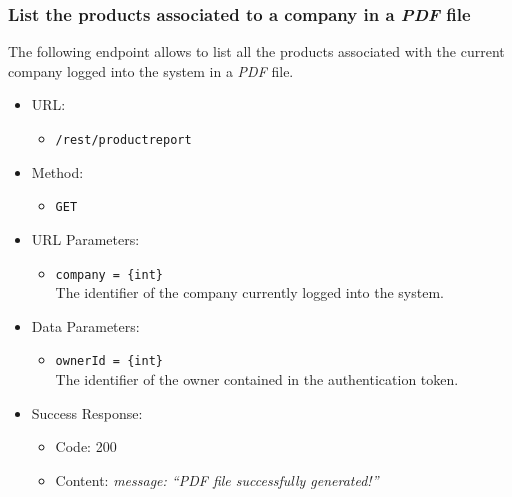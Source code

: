 \newpage
\subsubsection*{List the products associated to a company in a \textit{PDF} file}

The following endpoint allows to list all the products associated with the current company logged into the system in a \textit{PDF} file.

\begin{itemize}
    
    \item URL: 
    \begin{itemize}
        \item \texttt{/rest/productreport}
    \end{itemize}
    
    \item Method: 
    \begin{itemize}
        \item \texttt{GET}
    \end{itemize}
    
    \item URL Parameters: 
    \begin{itemize}
        \item \texttt{company = \{int\}} \\
        The identifier of the company currently logged into the system.
    \end{itemize}
    
    \item Data Parameters: 
    \begin{itemize}
        \item \texttt{ownerId = \{int\}} \\
        The identifier of the owner contained in the authentication token.
    \end{itemize}
    
    \item Success Response: 
    \begin{itemize}
        \item Code: 200
        \item Content:
        \textit{            
{
    message: “PDF file successfully generated!”
}
        }
    \end{itemize}
    

\end{itemize}
